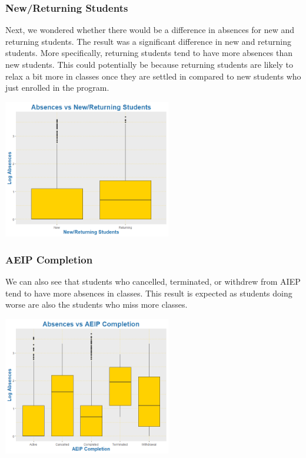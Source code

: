 \documentclass[12pt,letterpaper]{article}
\begin{document}
\subsubsection{New/Returning Students}

Next, we wondered whether there would be a difference in absences for new and returning students. The result was a significant difference in new and returning students. More specifically, returning students tend to have more absences than new students. This could potentially be because returning students are likely to relax a bit more in classes once they are settled in compared to new students who just enrolled in the program.

\begin{center}
    \includegraphics[width = 0.55\textwidth]{Plots/2. New Returning Students.png}
\end{center}

\subsubsection{AEIP Completion}

We can also see that students who cancelled, terminated, or withdrew from AIEP tend to have more absences in classes. This result is expected as students doing worse are also the students who miss more classes.

\begin{center}
    \includegraphics[width = 0.55\textwidth]{Plots/3. AEIP Completion.png}
\end{center}
\end{document}
